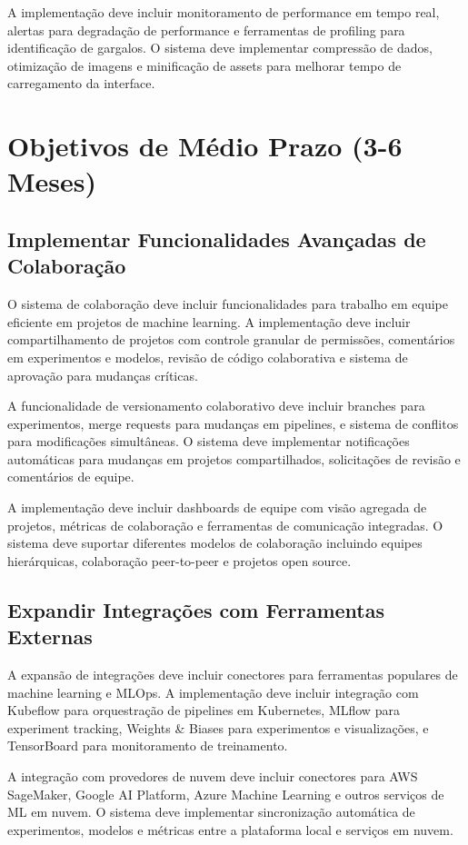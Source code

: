 \documentclass[12pt,a4paper]{article}
\begin{document}
A implementação deve incluir monitoramento de performance em tempo real, alertas para degradação de performance e ferramentas de profiling para identificação de gargalos. O sistema deve implementar compressão de dados, otimização de imagens e minificação de assets para melhorar tempo de carregamento da interface.

\section{Objetivos de Médio Prazo (3-6 Meses)}

\subsection{Implementar Funcionalidades Avançadas de Colaboração}

O sistema de colaboração deve incluir funcionalidades para trabalho em equipe eficiente em projetos de machine learning. A implementação deve incluir compartilhamento de projetos com controle granular de permissões, comentários em experimentos e modelos, revisão de código colaborativa e sistema de aprovação para mudanças críticas.

A funcionalidade de versionamento colaborativo deve incluir branches para experimentos, merge requests para mudanças em pipelines, e sistema de conflitos para modificações simultâneas. O sistema deve implementar notificações automáticas para mudanças em projetos compartilhados, solicitações de revisão e comentários de equipe.

A implementação deve incluir dashboards de equipe com visão agregada de projetos, métricas de colaboração e ferramentas de comunicação integradas. O sistema deve suportar diferentes modelos de colaboração incluindo equipes hierárquicas, colaboração peer-to-peer e projetos open source.

\subsection{Expandir Integrações com Ferramentas Externas}

A expansão de integrações deve incluir conectores para ferramentas populares de machine learning e MLOps. A implementação deve incluir integração com Kubeflow para orquestração de pipelines em Kubernetes, MLflow para experiment tracking, Weights & Biases para experimentos e visualizações, e TensorBoard para monitoramento de treinamento.

A integração com provedores de nuvem deve incluir conectores para AWS SageMaker, Google AI Platform, Azure Machine Learning e outros serviços de ML em nuvem. O sistema deve implementar sincronização automática de experimentos, modelos e métricas entre a plataforma local e serviços em nuvem.
\end{document}
